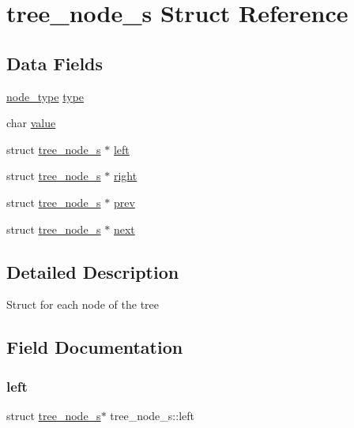 \hypertarget{structtree__node__s}{}\section{tree\+\_\+node\+\_\+s Struct Reference}
\label{structtree__node__s}
\subsection*{Data Fields}
\begin{DoxyCompactItemize}
\item 
\mbox{\hyperlink{list_8h_a6a276b85e2da28c5f9c3dbce61c55682}{node\+\_\+type}} \mbox{\hyperlink{structtree__node__s_a090b69b8f438d25df237e4b217eac3e5}{type}}
\item 
char \mbox{\hyperlink{structtree__node__s_a3f82a6355d2a50f51dcafd8217aa8e20}{value}}
\item 
struct \mbox{\hyperlink{structtree__node__s}{tree\+\_\+node\+\_\+s}} $\ast$ \mbox{\hyperlink{structtree__node__s_a06f95eb6b6b6d8b13c83d797532ecc2f}{left}}
\item 
struct \mbox{\hyperlink{structtree__node__s}{tree\+\_\+node\+\_\+s}} $\ast$ \mbox{\hyperlink{structtree__node__s_abed0324b1cb4a573e75d7bc58c555332}{right}}
\item 
struct \mbox{\hyperlink{structtree__node__s}{tree\+\_\+node\+\_\+s}} $\ast$ \mbox{\hyperlink{structtree__node__s_abaa4a0dec19de2b05bbc50d7804f5155}{prev}}
\item 
struct \mbox{\hyperlink{structtree__node__s}{tree\+\_\+node\+\_\+s}} $\ast$ \mbox{\hyperlink{structtree__node__s_a11868a6a9d5175dadb40fd7a7a40245a}{next}}
\end{DoxyCompactItemize}


\subsection{Detailed Description}
Struct for each node of the tree 

\subsection{Field Documentation}
\mbox{\label{structtree__node__s_a06f95eb6b6b6d8b13c83d797532ecc2f}} 
\subsubsection{\texorpdfstring{left}{left}}
{\footnotesize\ttfamily struct \mbox{\hyperlink{structtree__node__s}{tree\+\_\+node\+\_\+s}}$\ast$ tree\+\_\+node\+\_\+s\+::left}

